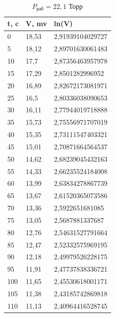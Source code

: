 \documentclass[12pt]{article}
\begin{document}
\begin{table}[H]
	\centering
	\begin{tabular}{|l|l|l|}
		\hline
		t, c & V, mv & ln(V)            \\ \hline
		0    & 18,53 & 2,91939104029727 \\ \hline
		5    & 18,12 & 2,89701630061483 \\ \hline
		10   & 17,7  & 2,87356463957978 \\ \hline
		15   & 17,29 & 2,8501282996952  \\ \hline
		20   & 16,89 & 2,82672173081971 \\ \hline
		25   & 16,5  & 2,80336038090653 \\ \hline
		30   & 16,11 & 2,77944019718888 \\ \hline
		35   & 15,73 & 2,75556971707019 \\ \hline
		40   & 15,35 & 2,73111547403321 \\ \hline
		45   & 15,01 & 2,70871664564537 \\ \hline
		50   & 14,62 & 2,68239045432163 \\ \hline
		55   & 14,33 & 2,66235524184008 \\ \hline
		60   & 13,99 & 2,63834278867739 \\ \hline
		65   & 13,67 & 2,61520365073586 \\ \hline
		70   & 13,36 & 2,5922651681085  \\ \hline
		75   & 13,05 & 2,5687881337687  \\ \hline
		80   & 12,76 & 2,54631527791664 \\ \hline
		85   & 12,47 & 2,52332575969195 \\ \hline
		90   & 12,18 & 2,49979526228175 \\ \hline
		95   & 11,91 & 2,47737838336721 \\ \hline
		100  & 11,65 & 2,45530618001171 \\ \hline
		105  & 11,38 & 2,43185742869818 \\ \hline
		110  & 11,13 & 2,40964416528745 \\ \hline
	\end{tabular}
	\caption{$P_\text{раб} = 22,1$ Торр}
\end{table}
\end{document}
